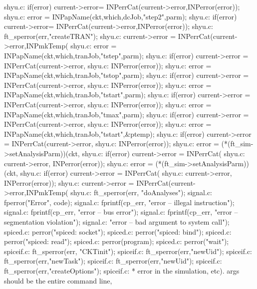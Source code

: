 {{{{{shyu.c:            if(error) current->error= INPerrCat(current->error,INPerror(error));
shyu.c:            error = INPapName(ckt,which,dcJob,"step2",parm);
shyu.c:            if(error) current->error= INPerrCat(current->error,INPerror(error));
shyu.c:                ft_sperror(err,"createTRAN"); 
shyu.c:            current->error = INPerrCat(current->error,INPmkTemp(
shyu.c:        error = INPapName(ckt,which,tranJob,"tstep",parm);
shyu.c:        if(error) current->error = INPerrCat(current->error,
shyu.c:        INPerror(error));
shyu.c:        error = INPapName(ckt,which,tranJob,"tstop",parm);
shyu.c:        if(error) current->error = INPerrCat(current->error,
shyu.c:        INPerror(error));
shyu.c:            error = INPapName(ckt,which,tranJob,"tstart",parm);
shyu.c:            if(error) current->error = INPerrCat(current->error,
shyu.c:            INPerror(error));
shyu.c:            error = INPapName(ckt,which,tranJob,"tmax",parm);
shyu.c:            if(error) current->error = INPerrCat(current->error,
shyu.c:            INPerror(error));
shyu.c:                    error = INPapName(ckt,which,tranJob,"tstart",&ptemp);
shyu.c:                    if(error) current->error = INPerrCat(current->error,
shyu.c:                    INPerror(error));
shyu.c:                    error = (*(ft_sim->setAnalysisParm))(ckt,
shyu.c:                    if(error) current->error = INPerrCat(
shyu.c:                    current->error, INPerror(error));
shyu.c:                    error = (*(ft_sim->setAnalysisParm))(ckt,
shyu.c:                    if(error) current->error = INPerrCat(
shyu.c:                    current->error, INPerror(error));
shyu.c:            current->error = INPerrCat(current->error,INPmkTemp(
shyu.c:        ft_sperror(err, "doAnalyses");
signal.c:    fperror("Error", code);
signal.c:    fprintf(cp_err, "\ninternal error -- illegal instruction\n");
signal.c:    fprintf(cp_err, "\ninternal error -- bus error\n");
signal.c:    fprintf(cp_err, "\ninternal error -- segmentation violation\n");
signal.c:        "\ninternal error -- bad argument to system call\n");
spiced.c:            perror("spiced: socket");
spiced.c:            perror("spiced: bind");
spiced.c:        perror("spiced: read");
spiced.c:        perror(program);
spiced.c:        perror("wait");
spiceif.c:        ft_sperror(err, "CKTinit");
spiceif.c:        ft_sperror(err,"newUid");
spiceif.c:        ft_sperror(err,"newTask");
spiceif.c:            ft_sperror(err,"newUid");
spiceif.c:            ft_sperror(err,"createOptions");
spiceif.c: * error in the simulation, etc). args should be the entire command line,
}}}}}
